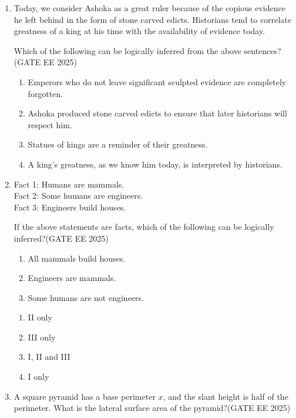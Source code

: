 \begin{enumerate}[leftmargin=*,label=\textbf{Q.\arabic*},resume]
\item Today, we consider Ashoka as a great ruler because of the copious evidence he left behind in the form of stone carved edicts. Historians tend to correlate greatness of a king at his time with the availability of evidence today.

Which of the following can be logically inferred from the above sentences?\hfill {(GATE EE 2025)}
\begin{enumerate}
\item Emperors who do not leave significant sculpted evidence are completely forgotten.
\item Ashoka produced stone carved edicts to ensure that later historians will respect him.
\item Statues of kings are a reminder of their greatness.
\item A king’s greatness, as we know him today, is interpreted by historians.
\end{enumerate}

\item Fact 1: Humans are mammals.\\ 
Fact 2: Some humans are engineers.\\ 
Fact 3: Engineers build houses.

If the above statements are facts, which of the following can be logically inferred?\hfill {(GATE EE 2025)}

\begin{enumerate}[label=\roman*.]
\item All mammals build houses.
\item Engineers are mammals.
\item Some humans are not engineers.
\end{enumerate}

\begin{multicols}{2}
\begin{enumerate}
\item II only
\item III only
\item I, II and III
\item I only
\end{enumerate}
\end{multicols}

\item A square pyramid has a base perimeter $x$, and the slant height is half of the perimeter. What is the lateral surface area of the pyramid?\hfill {(GATE EE 2025)}


\end{enumerate}
